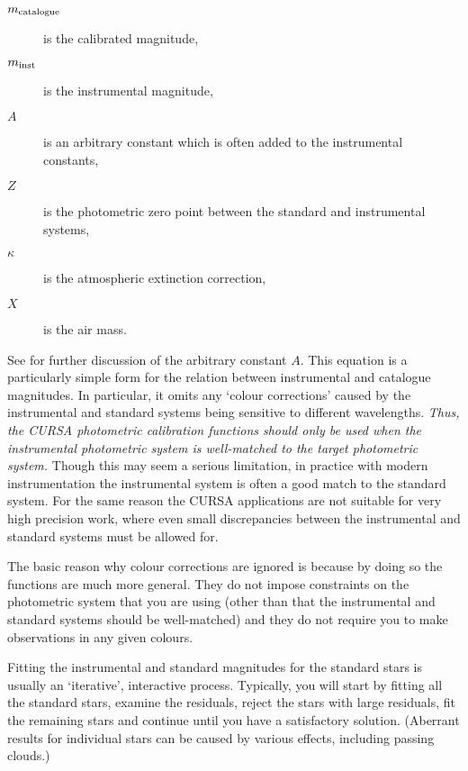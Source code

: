 \documentclass[twoside,11pt]{starlink}
\begin{document}
\begin{description}

  \item[$m_{\rm catalogue}$] is the calibrated magnitude,

  \item[$m_{\rm inst}$] is the instrumental magnitude,

  \item[$A$] is an arbitrary constant which is often added to the
   instrumental constants,

  \item[$Z$] is the photometric zero point between the standard and
   instrumental systems,

  \item[$\kappa$] is the atmospheric extinction correction,

  \item[$X$] is the air mass.

\end{description}

See  for further discussion of the arbitrary constant
$A$.  This equation is a particularly simple form for the relation
between instrumental and catalogue magnitudes.  In particular, it omits
any `colour corrections' caused by the instrumental and standard
systems being sensitive to different wavelengths.  \textit{Thus, the
CURSA photometric calibration functions should only be used when the
instrumental photometric system is well-matched to the target
photometric system.}  Though this may seem a serious limitation,
in practice with modern instrumentation the instrumental system is often
a good match to the standard system.  For the same reason the CURSA
applications are not suitable for very high precision work, where even
small discrepancies between the instrumental and standard systems
must be allowed for.

The basic reason why colour corrections are ignored is because by doing
so the functions are much more general.  They do not impose constraints
on the photometric system that you are using (other than that the
instrumental and standard systems should be well-matched) and they do
not require you to make observations in any given colours.

Fitting the instrumental and standard magnitudes for the standard stars
is usually an `iterative', interactive process.  Typically, you will
start by fitting all the standard stars, examine the residuals,
reject the stars with large residuals, fit the remaining stars and
continue until you have a satisfactory solution.  (Aberrant results
for individual stars can be caused by various effects, including
passing clouds.)
\end{document}
